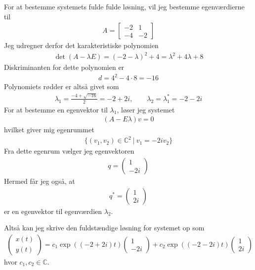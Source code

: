 \documentclass[12pt]{article}
\begin{document}
For at bestemme systemets fulde fulde løsning, vil jeg bestemme egenværdierne til 
\begin{align}
A = \begin{bmatrix}
-2 & 1 \\
-4 & -2
\end{bmatrix}
\end{align}
Jeg udregner derfor det karakteristiske polynomien
\begin{align}
\det(A - \lambda E) = (-2 - \lambda)^2 + 4 = \lambda^2 + 4\lambda + 8
\end{align}
Diskriminanten for dette polynomien er
\begin{align}
d = 4^2 - 4\cdot 8 = -16
\end{align}
Polynomiets rødder er altså givet som
\begin{align}
\lambda_1 = \frac{-4 + \sqrt{-16}}{2} = -2 + 2i, \qquad \lambda_2=\lambda_1^* = -2 - 2i
\end{align}
For at bestemme en egenvektor til $\lambda_1$, løser jeg systemet
\begin{align}
(A - E\lambda)v = 0
\end{align}
hvilket giver mig egenrummet
\begin{align}
\{(v_1, v_2) \in \mathbb{C}^2 \ |\ v_1 = -2i v_2 \}
\end{align}
Fra dette egenrum vælger jeg egenvektoren
\begin{align}
q = \begin{pmatrix}
1 \\ -2i
\end{pmatrix}
\end{align}
Hermed får jeg også, at 
\begin{align}
q^* = \begin{pmatrix}
1 \\ 2i
\end{pmatrix}
\end{align}
er en egenvektor til egenværdien $\lambda_2$.

Altså kan jeg skrive den fuldstændige løsning for systemet op som
\begin{align}
\begin{pmatrix}
x(t) \\ y(t)
\end{pmatrix} = c_1\exp((-2+2i) t)\begin{pmatrix}
1 \\ -2i
\end{pmatrix} + c_2\exp((-2-2i) t)\begin{pmatrix}
1 \\ 2i
\end{pmatrix} 
\end{align}
hvor $c_1, c_2 \in \mathbb{C}$. 
\end{document}
